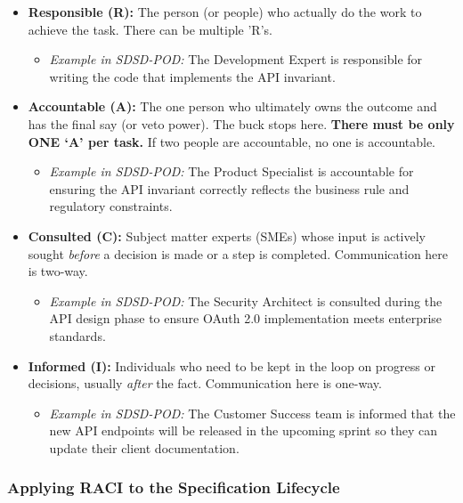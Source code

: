 \documentclass[
  11pt,
  openany,
  oneside]{book}
\providecommand{\tightlist}{%
  \setlength{\itemsep}{0pt}\setlength{\parskip}{0pt}}
\begin{document}
\begin{itemize}
\tightlist
\item
  \textbf{Responsible (R):} The person (or people) who actually do the
  work to achieve the task. There can be multiple 'R's.

  \begin{itemize}
  \tightlist
  \item
    \emph{Example in SDSD-POD:} The Development Expert is responsible
    for writing the code that implements the API invariant.
  \end{itemize}
\item
  \textbf{Accountable (A):} The one person who ultimately owns the
  outcome and has the final say (or veto power). The buck stops here.
  \textbf{There must be only ONE `A' per task.} If two people are
  accountable, no one is accountable.

  \begin{itemize}
  \tightlist
  \item
    \emph{Example in SDSD-POD:} The Product Specialist is accountable
    for ensuring the API invariant correctly reflects the business rule
    and regulatory constraints.
  \end{itemize}
\item
  \textbf{Consulted (C):} Subject matter experts (SMEs) whose input is
  actively sought \emph{before} a decision is made or a step is
  completed. Communication here is two-way.

  \begin{itemize}
  \tightlist
  \item
    \emph{Example in SDSD-POD:} The Security Architect is consulted
    during the API design phase to ensure OAuth 2.0 implementation meets
    enterprise standards.
  \end{itemize}
\item
  \textbf{Informed (I):} Individuals who need to be kept in the loop on
  progress or decisions, usually \emph{after} the fact. Communication
  here is one-way.

  \begin{itemize}
  \tightlist
  \item
    \emph{Example in SDSD-POD:} The Customer Success team is informed
    that the new API endpoints will be released in the upcoming sprint
    so they can update their client documentation.
  \end{itemize}
\end{itemize}

\subsubsection{Applying RACI to the Specification
Lifecycle}\label{applying-raci-to-the-specification-lifecycle}
\end{document}
